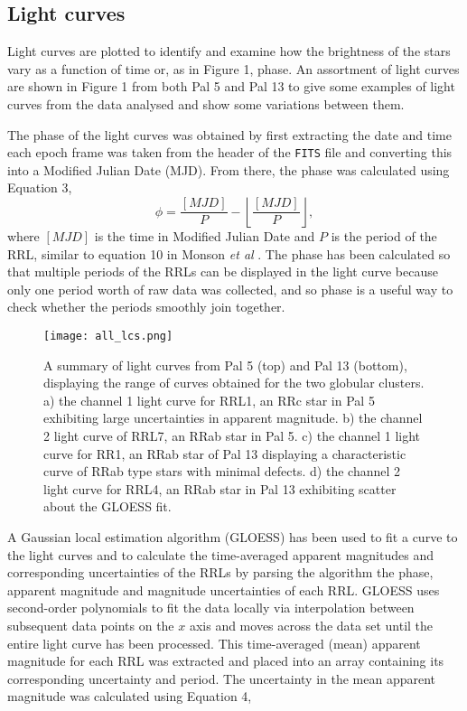 \documentclass[11pt]{iopart}
\begin{document}
\subsection{Light curves}
\label{light curves}
Light curves are plotted to identify and examine how the brightness of the stars vary as a function of time or, as in Figure 1, phase. An assortment of light curves are shown in Figure 1 from both Pal 5 and Pal 13 to give some examples of light curves from the data analysed and show some variations between them.

The phase of the light curves was obtained by first extracting the date and time each epoch frame was taken from the header of the \verb"FITS" file and converting this into a Modified Julian Date (MJD). From there, the phase was calculated using Equation 3,
\begin{equation}
    \phi = \frac{[MJD]}{P} - \left\lfloor\frac{[MJD]}{P}\right\rfloor,
\end{equation}
where $[MJD]$ is the time in Modified Julian Date and $P$ is the period of the RRL, similar to equation 10 in Monson \textit{et al} \cite{monson2017}. The phase has been calculated so that multiple periods of the RRLs can be displayed in the light curve because only one period worth of raw data was collected, and so phase is a useful way to check whether the periods smoothly join together.
\begin{figure}
    \centering
    \texttt{[image: all\_lcs.png]} %
    \footnotesize
    \caption{A summary of light curves from Pal 5 (top) and Pal 13 (bottom), displaying the range of curves obtained for the two globular clusters. a) the channel 1 light curve for RRL1, an RRc star in Pal 5 exhibiting large uncertainties in apparent magnitude. b) the channel 2 light curve of RRL7, an RRab star in Pal 5. c) the channel 1 light curve for RR1, an RRab star of Pal 13 displaying a characteristic curve of RRab type stars with minimal defects. d) the channel 2 light curve for RRL4, an RRab star in Pal 13 exhibiting scatter about the GLOESS fit.}
    \label{fig:light curves}
    \normalsize
\end{figure}
A Gaussian local estimation algorithm (GLOESS) \cite{persson2004} has been used to fit a curve to the light curves and to calculate the time-averaged apparent magnitudes and corresponding uncertainties of the RRLs by parsing the algorithm the phase, apparent magnitude and magnitude uncertainties of each RRL. GLOESS uses second-order polynomials to fit the data locally via interpolation between subsequent data points on the $x$ axis \cite{monson2012} and moves across the data set until the entire light curve has been processed. This time-averaged (mean) apparent magnitude for each RRL was extracted and placed into an array containing its corresponding uncertainty and period. The uncertainty in the mean apparent magnitude was calculated using Equation 4,
\end{document}

